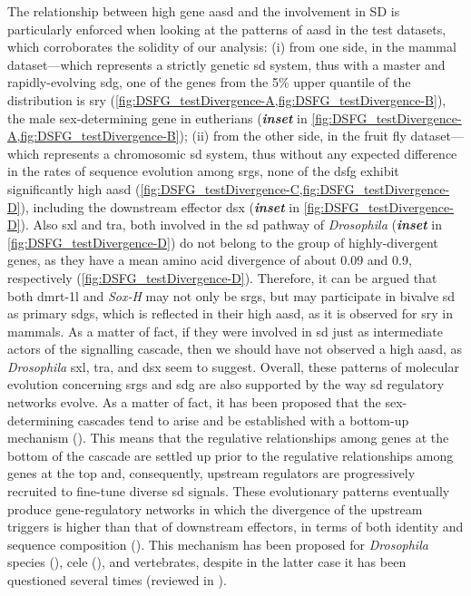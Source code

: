 The relationship between high gene \gls{aasd} and the involvement in SD is particularly enforced when looking at the patterns of \gls{aasd} in the test datasets, which corroborates the solidity of our analysis: (i) from one side, in the mammal dataset—which represents a strictly genetic \gls{sd} system, thus with a master and rapidly-evolving \gls{sdg}, one of the genes from the 5\% upper quantile of the distribution is \gls{sry} (\cref{fig:DSFG_testDivergence-A,fig:DSFG_testDivergence-B}), the male sex-determining gene in eutherians (\textbf{\textit{inset}} in \cref{fig:DSFG_testDivergence-A,fig:DSFG_testDivergence-B}); (ii) from the other side, in the fruit fly dataset—which represents a chromosomic \gls{sd} system, thus without any expected difference in the rates of sequence evolution among \glspl{srg}, none of the \gls{dsfg} exhibit significantly high \gls{aasd} (\cref{fig:DSFG_testDivergence-C,fig:DSFG_testDivergence-D}), including the downstream effector \gls{dsx} (\textit{\textbf{inset}} in \cref{fig:DSFG_testDivergence-D}). Also \gls{sxl} and \gls{tra}, both involved in the \gls{sd} pathway of \textit{Drosophila} (\textit{\textbf{inset}} in \cref{fig:DSFG_testDivergence-D}) do not belong to the group of highly-divergent genes, as they have a mean amino acid divergence of about 0.09 and 0.9, respectively (\cref{fig:DSFG_testDivergence-D}). Therefore, it can be argued that both \gls{dmrt-1l} and \textit{Sox-H} may not only be \glspl{srg}, but may participate in bivalve \gls{sd} as primary \glspl{sdg}, which is reflected in their high \gls{aasd}, as it is observed for \gls{sry} in mammals. As a matter of fact, if they were involved in \gls{sd} just as intermediate actors of the signalling cascade, then we should have not observed a high \gls{aasd}, as \textit{Drosophila} \gls{sxl}, \gls{tra}, and \gls{dsx} seem to suggest. Overall, these patterns of molecular evolution concerning \glspl{srg} and \gls{sdg} are also supported by the way \gls{sd} regulatory networks evolve. As a matter of fact, it has been proposed that the sex-determining cascades tend to arise and be established with a bottom-up mechanism (\textbf{\cite{wilkins1995moving, mullon2012drosophila_sxl, beukeboom2014evolution, capel2017vertebrate}}). This means that the regulative relationships among genes at the bottom of the cascade are settled up prior to the regulative relationships among genes at the top and, consequently, upstream regulators are progressively recruited to fine-tune diverse \gls{sd} signals. These evolutionary patterns eventually produce gene-regulatory networks in which the divergence of the upstream triggers is higher than that of downstream effectors, in terms of both identity and sequence composition (\textbf{\cite{beukeboom2014evolution}}). This mechanism has been proposed for \textit{Drosophila} species (\textbf{\cite{mullon2012drosophila_sxl}}), \gls{cele} (\textbf{\cite{stothard2003sex}}), and vertebrates, despite in the latter case it has been questioned several times (reviewed in \textbf{\cite{capel2017vertebrate}}).

